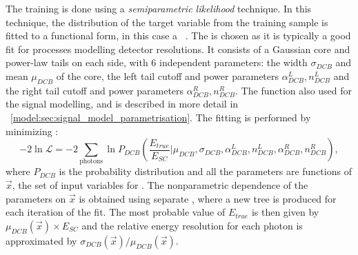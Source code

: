 The training is done using a \emph{semiparametric likelihood} technique. In this technique, the distribution of the target variable from the training sample is fitted to a functional form, in this case a \DCB~\cite{CrystalBallFunction}. The \DCB is chosen as it is typically a good fit for processes modelling detector resolutions. It consists of a Gaussian core and power-law tails on each side, with 6 independent parameters: the width $\sigma_{DCB}$ and mean $\mu_{DCB}$ of the core, the left tail cutoff and power parameters $\alpha_{DCB}^{L},n_{DCB}^{L}$ and the right tail cutoff and power parameters $\alpha_{DCB}^{R},n_{DCB}^{R}$. The \DCB function also used for the signal modelling, and is described in more detail in \Sec~\ref{model:sec:signal_model_parametrisation}. The fitting is performed by minimizing \NLL:
\begin{equation}
\label{reco:eq:regression:dcb}
 - 2\ln \mathcal{L} = -2 \sum_{\textrm{photons}} \ln P_{DCB}( \frac{E_{true}}{E_{SC}} | \mu_{DCB}, \sigma_{DCB}, \alpha_{DCB}^{L},n_{DCB}^{L}, \alpha_{DCB}^{R},n_{DCB}^{R} ) , 
\end{equation}
 where $P_{DCB}$ is the \DCB probability distribution and all the \DCB parameters are functions of $\vec{x}$, the set of input variables for \PhoEnergyBdt. The nonparametric dependence of the \DCB parameters on $\vec{x}$ is obtained using separate \BDT\s, where a new tree is produced for each iteration of the \NLL fit. The most probable value of $E_{true}$ is then given by $\mu_{DCB}(\vec{x}) \times E_{SC}$ and the relative energy resolution for each photon is approximated by $\sigma_{DCB}(\vec{x}) / \mu_{DCB}(\vec{x})$.

%
%


